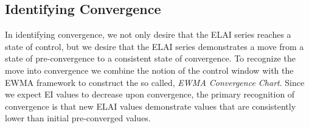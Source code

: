 \documentclass{article}
\begin{document}
%
%

%
%

%
%
\subsection{Identifying Convergence}
%
%

%
In identifying convergence, we not only desire that the ELAI series reaches a 
state of control, but we desire that the ELAI series demonstrates a move from 
a state of pre-convergence to a consistent state of convergence. To recognize 
the move into convergence we combine the notion of the control window with the 
EWMA framework to construct the so called, {\it EWMA Convergence Chart}. Since 
we expect EI values to decrease upon convergence, the primary recognition of 
convergence is that new ELAI values demonstrate values that are consistently 
lower than initial pre-converged values.

%
%
\end{document}

